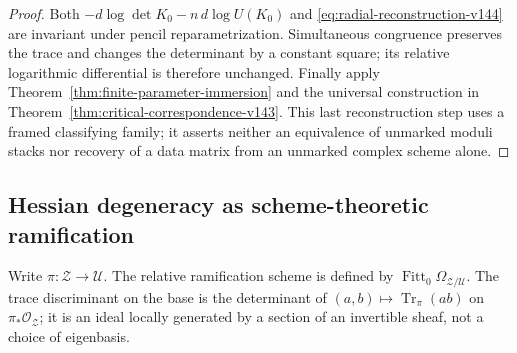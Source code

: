 \begin{proof}
Both \(-d\log\det K_0-n\,d\log U(K_0)\) and
\eqref{eq:radial-reconstruction-v144} are invariant under pencil
reparametrization.  Simultaneous congruence preserves the trace and
changes the determinant by a constant square; its relative logarithmic
differential is therefore unchanged.  Finally apply
Theorem~\ref{thm:finite-parameter-immersion} and the universal
construction in Theorem~\ref{thm:critical-correspondence-v143}.
This last reconstruction step uses a framed classifying family;
it asserts neither an equivalence of unmarked moduli stacks nor
recovery of a data matrix from an unmarked complex scheme alone.
\end{proof}

\subsection{Hessian degeneracy as scheme-theoretic ramification}
Write \(\pi:\mathscr Z\to\mathscr U\).  The relative ramification
scheme is defined by
\(\operatorname{Fitt}_0\Omega_{\mathscr Z/\mathscr U}\).
The trace discriminant on the base is the determinant of
\((a,b)\mapsto\operatorname{Tr}_{\pi}(ab)\) on
\(\pi_*\mathcal O_{\mathscr Z}\); it is an ideal locally generated
by a section of an invertible sheaf, not a choice of eigenbasis.

